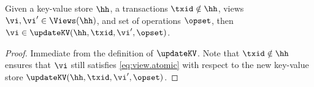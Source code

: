 \begin{lemma}
\label{lem:updatekv.preserveviews}
Given a key-value store $\hh$, a transactions $\txid \notin \hh$, views $\vi, \vi' \in \Views(\hh)$, 
and set of operations $\opset$, then $\vi \in \updateKV(\hh, \txid, \vi', \opset)$.
\end{lemma}

\begin{proof}
Immediate from the definition of $\updateKV$. Note that $\txid \notin \hh$ ensures that 
$\vi$ still satisfies \eqref{eq:view.atomic} with respect to the new key-value store $\updateKV(\hh, \txid, \vi', \opset)$.
\end{proof}
